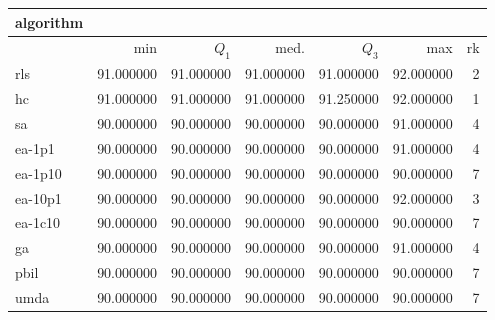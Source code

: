 \begin{tabular}{@{}l*{5}{>{{}}N{3}{0}}>{{}}N{2}{0}@{}}
\toprule
{algorithm} &  \\
\midrule
& {min} & {$Q_1$} & {med.} & {$Q_3$} & {max} & {rk}\\
\midrule
rls & {\color{blue}} 91.000000 & {\color{blue}} 91.000000 & {\color{blue}} 91.000000 & 91.000000 & {\color{blue}} 92.000000 & 2\\
hc & {\color{blue}} 91.000000 & {\color{blue}} 91.000000 & {\color{blue}} 91.000000 & {\color{blue}} 91.250000 & {\color{blue}} 92.000000 & 1\\
sa & 90.000000 & 90.000000 & 90.000000 & 90.000000 & 91.000000 & 4\\
ea-1p1 & 90.000000 & 90.000000 & 90.000000 & 90.000000 & 91.000000 & 4\\
ea-1p10 & 90.000000 & 90.000000 & 90.000000 & 90.000000 & 90.000000 & 7\\
ea-10p1 & 90.000000 & 90.000000 & 90.000000 & 90.000000 & {\color{blue}} 92.000000 & 3\\
ea-1c10 & 90.000000 & 90.000000 & 90.000000 & 90.000000 & 90.000000 & 7\\
ga & 90.000000 & 90.000000 & 90.000000 & 90.000000 & 91.000000 & 4\\
pbil & 90.000000 & 90.000000 & 90.000000 & 90.000000 & 90.000000 & 7\\
umda & 90.000000 & 90.000000 & 90.000000 & 90.000000 & 90.000000 & 7\\
\bottomrule
\end{tabular}
